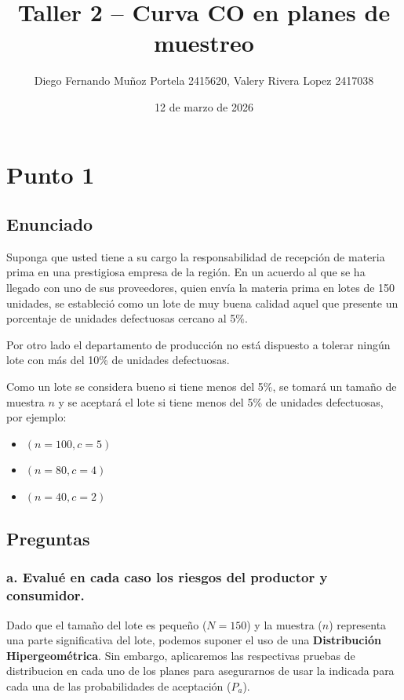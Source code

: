 \documentclass[
  12pt,
]{article}
\title{Taller 2 -- Curva CO en planes de muestreo}
\author{Diego Fernando Muñoz Portela 2415620, Valery Rivera Lopez
2417038}
\date{12 de marzo de 2026}
\providecommand{\tightlist}{%
  \setlength{\itemsep}{0pt}\setlength{\parskip}{0pt}}
\begin{document}
\maketitle

{
\setcounter{tocdepth}{3}
\tableofcontents
}
\section{Punto 1}\label{punto-1}

\subsection{Enunciado}\label{enunciado}

Suponga que usted tiene a su cargo la responsabilidad de recepción de
materia prima en una prestigiosa empresa de la región. En un acuerdo al
que se ha llegado con uno de sus proveedores, quien envía la materia
prima en lotes de 150 unidades, se estableció como un lote de muy buena
calidad aquel que presente un porcentaje de unidades defectuosas cercano
al 5\%.

Por otro lado el departamento de producción no está dispuesto a tolerar
ningún lote con más del 10\% de unidades defectuosas.

Como un lote se considera bueno si tiene menos del 5\%, se tomará un
tamaño de muestra \(n\) y se aceptará el lote si tiene menos del 5\% de
unidades defectuosas, por ejemplo:

\begin{itemize}
\tightlist
\item
  \((n=100, c=5)\)\\
\item
  \((n=80, c=4)\)\\
\item
  \((n=40, c=2)\)
\end{itemize}

\subsection{Preguntas}\label{preguntas}

\subsubsection{a. Evalué en cada caso los riesgos del productor y
consumidor.}\label{a.-evaluuxe9-en-cada-caso-los-riesgos-del-productor-y-consumidor.}

Dado que el tamaño del lote es pequeño (\(N=150\)) y la muestra (\(n\))
representa una parte significativa del lote, podemos suponer el uso de
una \textbf{Distribución Hipergeométrica}. Sin embargo, aplicaremos las
respectivas pruebas de distribucion en cada uno de los planes para
asegurarnos de usar la indicada para cada una de las probabilidades de
aceptación (\(P_a\)).
\end{document}
